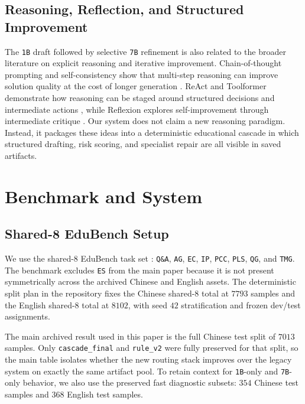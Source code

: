 \documentclass{article}
\begin{document}
\subsection{Reasoning, Reflection, and Structured Improvement}
The \texttt{1B} draft followed by selective \texttt{7B} refinement is also related to the broader literature on explicit reasoning and iterative improvement. Chain-of-thought prompting and self-consistency show that multi-step reasoning can improve solution quality at the cost of longer generation \cite{wei2022chain, self_consistency}. ReAct and Toolformer demonstrate how reasoning can be staged around structured decisions and intermediate actions \cite{react, toolformer}, while Reflexion explores self-improvement through intermediate critique \cite{reflexion}. Our system does not claim a new reasoning paradigm. Instead, it packages these ideas into a deterministic educational cascade in which structured drafting, risk scoring, and specialist repair are all visible in saved artifacts.

\section{Benchmark and System}
\subsection{Shared-8 EduBench Setup}
We use the shared-8 EduBench task set \cite{edubench}: \texttt{Q\&A}, \texttt{AG}, \texttt{EC}, \texttt{IP}, \texttt{PCC}, \texttt{PLS}, \texttt{QG}, and \texttt{TMG}. The benchmark excludes \texttt{ES} from the main paper because it is not present symmetrically across the archived Chinese and English assets. The deterministic split plan in the repository fixes the Chinese shared-8 total at \(7793\) samples and the English shared-8 total at \(8102\), with seed \(42\) stratification and frozen dev/test assignments.

The main archived result used in this paper is the full Chinese test split of \(7013\) samples. Only \texttt{cascade\_final} and \texttt{rule\_v2} were fully preserved for that split, so the main table isolates whether the new routing stack improves over the legacy system on exactly the same artifact pool. To retain context for \texttt{1B}-only and \texttt{7B}-only behavior, we also use the preserved fast diagnostic subsets: \(354\) Chinese test samples and \(368\) English test samples.
\end{document}
